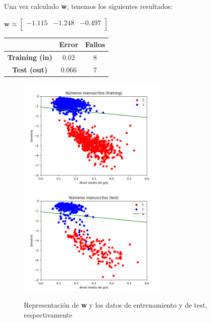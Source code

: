 \documentclass{article}
\begin{document}
    \vspace*{0.2in}
    Una vez calculado \textbf{w}, tenemos los siguientes resultados:
    \begin{center}
        $\textbf{w} \approx \begin{bmatrix}
            -1.115 & -1.248 & -0.497 \\
        \end{bmatrix}$
        \qquad
        \begin{tabular}{ |c|c|c| }
            \hline
            & \textbf{Error} & \textbf{Fallos} \\
            \hline
            \textbf{Training (in)} & 0.02 & 8 \\
            \hline
            \textbf{Test (out)} & 0.066 & 7 \\
            \hline
        \end{tabular}
    \end{center}
    \pagebreak
    \begin{figure}[h]
        \caption{Representación de \textbf{w} y los datos de entrenamiento y de test, respectivamente}
        \centering
        \includegraphics[width=0.65\textwidth]{Figure_8.png}
        \includegraphics[width=0.65\textwidth]{Figure_9.png}
    \end{figure}
\end{document}

